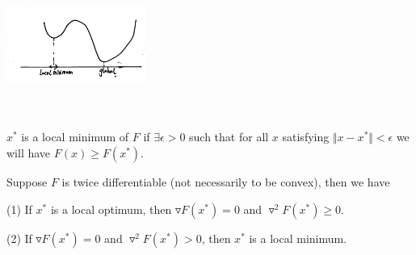 \begin{marginfigure}
	\centering
	\includegraphics[width=1.8in,height=1.8in]{figures/ch08/figure1111_1.png}
\end{marginfigure}

\begin{definition}
	$x^*$ is a local minimum of $F$ if $\exists \epsilon >0$ such that for all $x$ satisfying $\Vert x - x^*\Vert < \epsilon$ we will have $F(x) \geq F(x^*)$.
\end{definition}

\begin{theorem}
	Suppose $F$ is twice differentiable (not necessarily to be convex), then we have
	
	(1) If $x^*$ is a local optimum, then $\triangledown F(x^*) = 0$ and $\triangledown^2F(x^*)\geq 0$.
	
	(2) If $\triangledown F(x^*) = 0$ and $\triangledown^2F(x^*)> 0$, then $x^*$ is a local minimum. 
\end{theorem}

%

